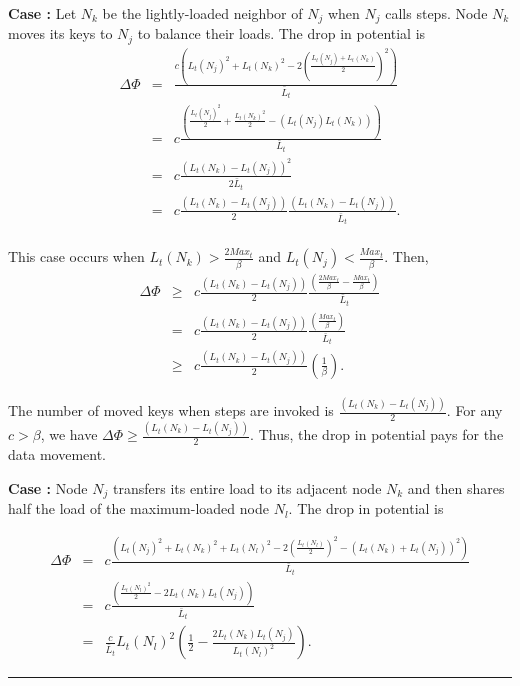 \documentclass[a4paper]{article}
\newenvironment{proof}{{\bf Proof:}}{\hfill\rule{1.5mm}{3mm}\vspace{0.1in}}
\begin{document}
\begin{proof}
  {\bf Case {\splitnbr}:} Let $N_k$ be the lightly-loaded neighbor of
  $N_j$ when $N_j$ calls {\splitnbr} steps. Node $N_k$ moves its keys
  to $N_j$ to balance their loads.  The drop in potential is
  \begin{eqnarray*}
    \Delta\Phi&=&
    \frac{c\left(L_t(N_j)^2+L_t(N_k)^2-2\left(\frac{L_t(N_j)+L_t(N_k)}{2}\right)^2\right)}{\bar{L}_t}\\
    &=&c\frac{\left(\frac{L_t(N_j)^2}{2}+\frac{L_t(N_k)^2}{2}-\left(L_t(N_j)L_t(N_k)\right)\right)}{\bar{L}_t}\\
    &=&c\frac{\left(L_t(N_k)-L_t(N_j)\right)^2}{2\bar{L}_t}\\		
    &=&c\frac{\left(L_t(N_k)-L_t(N_j)\right)}{2}\frac{\left(L_t(N_k)-L_t(N_j)\right)}{\bar{L}_t}.\\
  \end{eqnarray*}  
  
  This case occurs when
  $L_t(N_k)>\frac{2Max_t}{\beta}$ and $L_t(N_j)<\frac{Max_t}{\beta}$. Then,
  \begin{eqnarray*}
    \Delta\Phi&\geq
    &c\frac{\left(L_t(N_k)-L_t(N_j)\right)}{2}\frac{\left(\frac{2Max_t}{\beta}-\frac{Max_t}{\beta}\right)}{\bar{L}_t}\\
    &=&c\frac{\left(L_t(N_k)-L_t(N_j)\right)}{2}\frac{\left(\frac{Max_t}{\beta}\right)}{\bar{L}_t}\\
    &\geq
    &c\frac{\left(L_t(N_k)-L_t(N_j)\right)}{2}\left(\frac{1}{\beta}\right).
  \end{eqnarray*}

  The number of moved keys when {\splitnbr} steps are invoked is
  $\frac{\left(L_t(N_k)-L_t(N_j)\right)}{2}$. For any $c>\beta$, we have
  $\Delta\Phi\geq \frac{\left(L_t(N_k)-L_t(N_j)\right)}{2}$.  Thus,
  the drop in potential pays for the data movement.

  {\bf Case {\splitmax}:} Node $N_j$ transfers its entire load to its
  adjacent node $N_k$ and then shares half the load of the
  maximum-loaded node $N_l$.  The drop in potential is

  \begin{eqnarray*}
    \Delta\Phi&=& c\frac{\left(L_t(N_j)^2+L_t(N_k)^2+L_t(N_l)^2
        -2\left(\frac{L_t(N_l)}{2}\right)^2-\left(L_t(N_k)+L_t(N_j)\right)^2\right)}{\bar{L}_t}\\
    &=&
    c\frac{\left(\frac{L_t(N_l)^2}{2}-2L_t(N_k)L_t(N_j)\right)}{\bar{L}_t}\\
    &=& \frac{c}{\bar{L}_t}
    L_t(N_l)^2\left(\frac{1}{2}-\frac{2L_t(N_k)L_t(N_j)}{L_t(N_l)^2}\right).
\end{eqnarray*}  


\end{proof}
\end{document}
